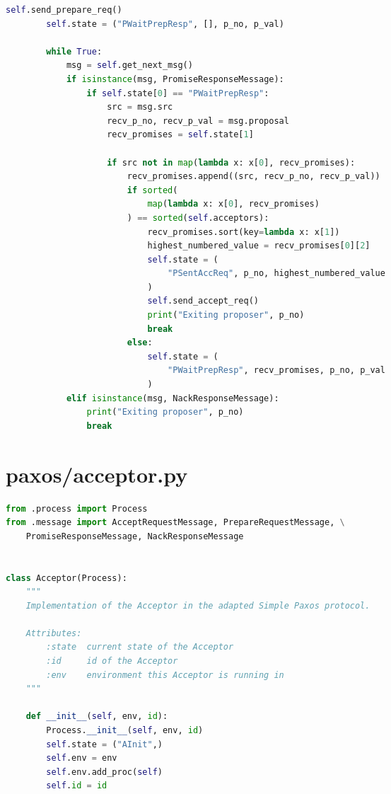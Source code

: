 \begin{landscape}
\begin{multicols*}{2}
\begin{lstlisting}[language=Python]
        self.send_prepare_req()
        self.state = ("PWaitPrepResp", [], p_no, p_val)

        while True:
            msg = self.get_next_msg()
            if isinstance(msg, PromiseResponseMessage):
                if self.state[0] == "PWaitPrepResp":
                    src = msg.src
                    recv_p_no, recv_p_val = msg.proposal
                    recv_promises = self.state[1]

                    if src not in map(lambda x: x[0], recv_promises):
                        recv_promises.append((src, recv_p_no, recv_p_val))
                        if sorted(
                            map(lambda x: x[0], recv_promises)
                        ) == sorted(self.acceptors):
                            recv_promises.sort(key=lambda x: x[1])
                            highest_numbered_value = recv_promises[0][2]
                            self.state = (
                                "PSentAccReq", p_no, highest_numbered_value
                            )
                            self.send_accept_req()
                            print("Exiting proposer", p_no)
                            break
                        else:
                            self.state = (
                                "PWaitPrepResp", recv_promises, p_no, p_val
                            )
            elif isinstance(msg, NackResponseMessage):
                print("Exiting proposer", p_no)
                break
\end{lstlisting}
\end{multicols*}

\newpage

\section{paxos/acceptor.py}
\begin{multicols*}{2}
\begin{lstlisting}[language=Python]
from .process import Process
from .message import AcceptRequestMessage, PrepareRequestMessage, \
    PromiseResponseMessage, NackResponseMessage


class Acceptor(Process):
    """
    Implementation of the Acceptor in the adapted Simple Paxos protocol.

    Attributes:
        :state  current state of the Acceptor
        :id     id of the Acceptor
        :env    environment this Acceptor is running in
    """

    def __init__(self, env, id):
        Process.__init__(self, env, id)
        self.state = ("AInit",)
        self.env = env
        self.env.add_proc(self)
        self.id = id


\end{lstlisting}
\end{multicols*}
\end{landscape}
